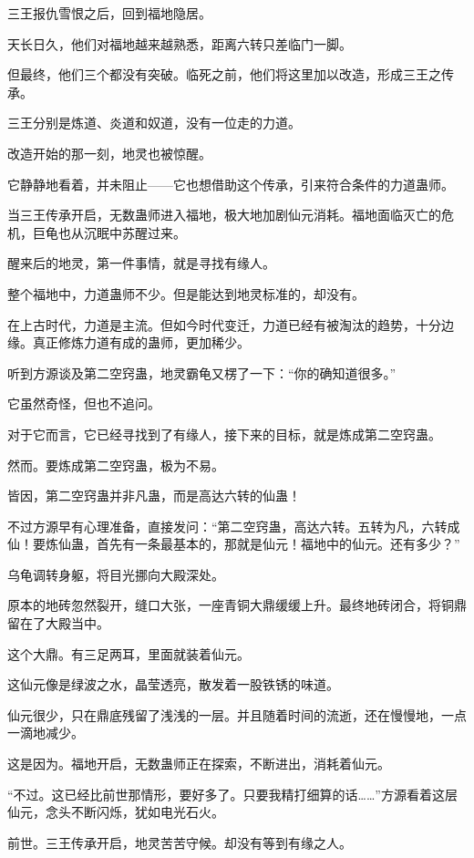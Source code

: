 \begin{this_body}
三王报仇雪恨之后，回到福地隐居。

天长日久，他们对福地越来越熟悉，距离六转只差临门一脚。

但最终，他们三个都没有突破。临死之前，他们将这里加以改造，形成三王之传承。

三王分别是炼道、炎道和奴道，没有一位走的力道。

改造开始的那一刻，地灵也被惊醒。

它静静地看着，并未阻止——它也想借助这个传承，引来符合条件的力道蛊师。

当三王传承开启，无数蛊师进入福地，极大地加剧仙元消耗。福地面临灭亡的危机，巨龟也从沉眠中苏醒过来。

醒来后的地灵，第一件事情，就是寻找有缘人。

整个福地中，力道蛊师不少。但是能达到地灵标准的，却没有。

在上古时代，力道是主流。但如今时代变迁，力道已经有被淘汰的趋势，十分边缘。真正修炼力道有成的蛊师，更加稀少。

听到方源谈及第二空窍蛊，地灵霸龟又楞了一下：“你的确知道很多。”

它虽然奇怪，但也不追问。

对于它而言，它已经寻找到了有缘人，接下来的目标，就是炼成第二空窍蛊。

然而。要炼成第二空窍蛊，极为不易。

皆因，第二空窍蛊并非凡蛊，而是高达六转的仙蛊！

不过方源早有心理准备，直接发问：“第二空窍蛊，高达六转。五转为凡，六转成仙！要炼仙蛊，首先有一条最基本的，那就是仙元！福地中的仙元。还有多少？”

乌龟调转身躯，将目光挪向大殿深处。

原本的地砖忽然裂开，缝口大张，一座青铜大鼎缓缓上升。最终地砖闭合，将铜鼎留在了大殿当中。

这个大鼎。有三足两耳，里面就装着仙元。

这仙元像是绿波之水，晶莹透亮，散发着一股铁锈的味道。

仙元很少，只在鼎底残留了浅浅的一层。并且随着时间的流逝，还在慢慢地，一点一滴地减少。

这是因为。福地开启，无数蛊师正在探索，不断进出，消耗着仙元。

“不过。这已经比前世那情形，要好多了。只要我精打细算的话……”方源看着这层仙元，念头不断闪烁，犹如电光石火。

前世。三王传承开启，地灵苦苦守候。却没有等到有缘之人。


\end{this_body}
